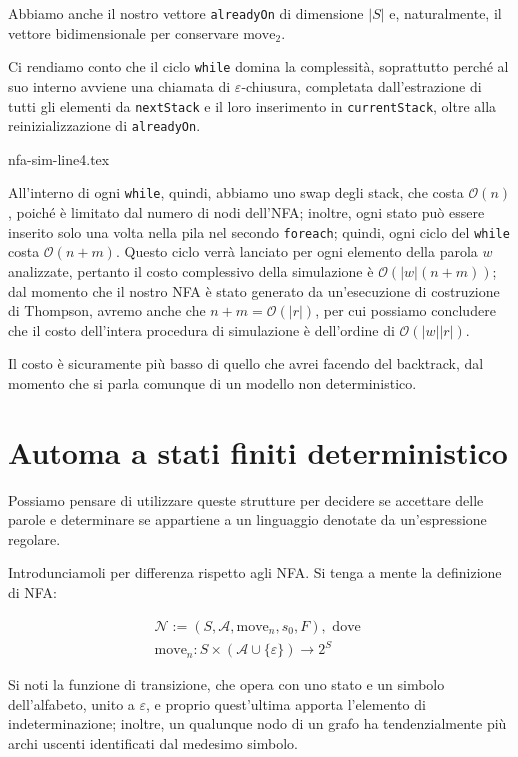 \documentclass[class=book, crop=false, oneside, 12pt]{standalone}
\begin{document}
\noindent Abbiamo anche il nostro vettore \texttt{alreadyOn} di dimensione \(|S|\) e, naturalmente, il vettore bidimensionale per conservare \(\textrm{move}_2\).

Ci rendiamo conto che il ciclo \texttt{while} domina la complessità, soprattutto perché al suo interno avviene una chiamata di \(\varepsilon\)-chiusura, completata dall'estrazione di tutti gli elementi da \texttt{nextStack} e il loro inserimento in \texttt{currentStack}, oltre alla reinizializzazione di \texttt{alreadyOn}.

{nfa-sim-line4.tex}

All'interno di ogni \texttt{while}, quindi, abbiamo uno swap degli stack, che costa \(\mathcal{O}(n)\), poiché è limitato dal numero di nodi dell'NFA; inoltre, ogni stato può essere inserito solo una volta nella pila nel secondo \texttt{foreach}; quindi, ogni ciclo del \texttt{while} costa \(\mathcal{O}(n + m)\). Questo ciclo verrà lanciato per ogni elemento della parola \(w\) analizzate, pertanto il costo complessivo della simulazione è \(\mathcal{O}(|w|(n + m))\); dal momento che il nostro NFA è stato generato da un'esecuzione di costruzione di Thompson, avremo anche che \(n + m = \mathcal{O}(|r|)\), per cui possiamo concludere che il costo  dell'intera procedura di simulazione è dell'ordine di \(\mathcal{O}(|w||r|)\).

Il costo è sicuramente più basso di quello che avrei facendo del backtrack, dal momento che si parla comunque di un modello non deterministico. 

\section{Automa a stati finiti deterministico}
Possiamo pensare di utilizzare queste strutture per decidere se accettare delle parole e determinare se appartiene a un linguaggio denotate da un'espressione regolare.

Introdunciamoli per differenza rispetto agli NFA. Si tenga a mente la definizione di NFA:

\begin{gather*}
    \mathcal{N} := (S, \mathcal{A}, \textrm{move}_n, s_0, F), \textrm{ dove } \\
    \textrm{move}_n : S \times (\mathcal{A} \cup \{\varepsilon\}) \to 2^S
\end{gather*}

Si noti la funzione di transizione, che opera con uno stato e un simbolo dell'alfabeto, unito a \(\varepsilon\), e proprio quest'ultima apporta l'elemento di indeterminazione; inoltre, un qualunque nodo di un grafo ha tendenzialmente più archi uscenti identificati dal medesimo simbolo.
\end{document}
